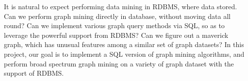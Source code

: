 It is natural to expect performing data mining in RDBMS, where data stored.
Can we perform graph mining directly in database, without moving data all round?
Can we implement various graph query methods via SQL, so as to leverage the powerful support from RDBMS?
Can we figure out a maverick graph, which has unusual features among a similar set of graph datasets?
In this project, our goal is to implement a SQL version of graph mining algorithms, and perform broad spectrum graph mining on a variety of graph dataset with the support of RDBMS.  

